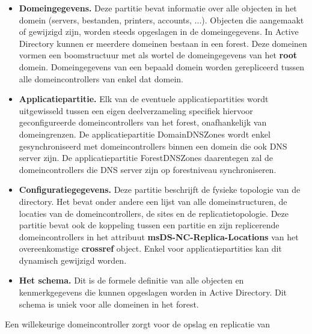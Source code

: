 \documentclass{report}
\begin{document}
\begin{enumerate}
		 {
			\begin{itemize}
				\item \textbf{Domeingegevens.} Deze partitie bevat informatie over alle objecten in het domein (servers, bestanden, printers, accounts, ...). Objecten die aangemaakt of gewijzigd zijn, worden steeds opgeslagen in de domeingegevens. In Active Directory kunnen er meerdere domeinen bestaan in een forest. Deze domeinen vormen een boomstructuur met als wortel de domeingegevens van het \textbf{root} domein. Domeingegevens van een bepaald domein worden gerepliceerd tussen alle domeincontrollers van enkel dat domein.
				\item \textbf{Applicatiepartitie.} Elk van de eventuele applicatiepartities wordt uitgewisseld tussen een eigen deelverzameling specifiek hiervoor geconfigureerde domeincontrollers van het forest, onafhankelijk van domeingrenzen. De applicatiepartitie DomainDNSZones wordt enkel gesynchroniseerd met domeincontrollers binnen een domein die ook DNS server zijn. De applicatiepartitie ForestDNSZones daarentegen zal de domeincontrollers die DNS server zijn op forestniveau synchroniseren.
				\item \textbf{Configuratiegegevens.} Deze partitie beschrijft de fysieke topologie van de directory. Het bevat onder andere een lijst van alle domeinstructuren, de locaties van de domeincontrollers, de sites en de replicatietopologie. Deze partitie bevat ook de koppeling tussen een partitie en zijn replicerende domeincontrollers in het attribuut \textbf{msDS-NC-Replica-Locations} van het overeenkomstige \textbf{crossref} object. Enkel voor applicatiepartities kan dit dynamisch gewijzigd worden. 
				\item \textbf{Het schema.} Dit is de formele definitie van alle objecten en kenmerkgegevens die kunnen opgeslagen worden in Active Directory. Dit schema is uniek voor alle domeinen in het forest.	
			\end{itemize}
			Een willekeurige domeincontroller zorgt voor de opslag en replicatie van 
			
		}
	\end{enumerate}
	
\end{document}
